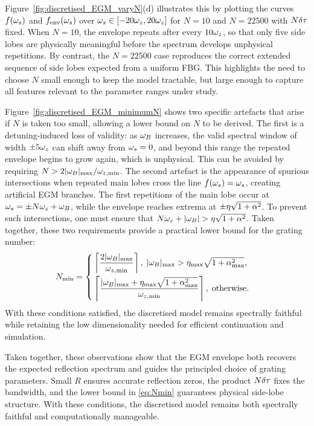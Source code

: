 Figure~\ref{fig:discretised_EGM_varyN}(d) illustrates this by plotting the curves $f(\omega_s)$ and $f_\text{env}(\omega_s)$ over $\omega_s \in [-20\omega_z,20\omega_z]$ for $N=10$ and $N=22500$ with $N\delta \tau$ fixed.
When $N=10$, the envelope repeats after every $10\omega_z$, so that only five side lobes are physically meaningful before the spectrum develops unphysical repetitions.
By contrast, the $N=22500$ case reproduces the correct extended sequence of side lobes expected from a uniform FBG.
This highlights the need to choose $N$ small enough to keep the model tractable, but large enough to capture all features relevant to the parameter ranges under study.
%
\par
%
Figure~\ref{fig:discretised_EGM_minimumN} shows two specific artefacts that arise if $N$ is taken too small, allowing a lower bound on $N$ to be derived.
The first is a detuning-induced loss of validity: as $\omega_B$ increases, the valid spectral window of width $\pm 5\omega_z$ can shift away from $\omega_s=0$, and beyond this range the repeated envelope begins to grow again, which is unphysical.
This can be avoided by requiring $N > 2|\omega_B|_{\max}/\omega_{z,\min}$.
The second artefact is the appearance of spurious intersections when repeated main lobes cross the line $f(\omega_s)=\omega_s$, creating artificial EGM branches.
The first repetitions of the main lobe occur at $\omega_s = \pm N\omega_z + \omega_B$, while the envelope reaches extrema at $\pm \eta\sqrt{1+\alpha^2}$.
To prevent such intersections, one must ensure that $N\omega_z + |\omega_B| > \eta\sqrt{1+\alpha^2}$.
Taken together, these two requirements provide a practical lower bound for the grating number:
%
\begin{equation}
    \label{eq:Nmin}
    N_\text{min} =
    \begin{cases}
    \left\lceil \dfrac{2|\omega_B|_{\max}}{\omega_{z,\min}} \right\rceil, \; |\omega_B|_{\max} > \eta_{\max}\sqrt{1+\alpha_{\max}^2}, \\[2ex]
    \left\lceil \dfrac{|\omega_B|_{\max} + \eta_{\max}\sqrt{1+\alpha_{\max}^2}}{\omega_{z,\min}} \right\rceil, \; \text{otherwise}.
    \end{cases}
\end{equation}
%
With these conditions satisfied, the discretised model remains spectrally faithful while retaining the low dimensionality needed for efficient continuation and simulation.
%
\par
%
Taken together, these observations show that the EGM envelope both recovers the expected reflection spectrum and guides the principled choice of grating parameters.
Small $R$ ensures accurate reflection zeros, the product $N\delta \tau$ fixes the bandwidth, and the lower bound in \eqref{eq:Nmin} guarantees physical side-lobe structure.
With these conditions, the discretised model remains both spectrally faithful and computationally manageable.